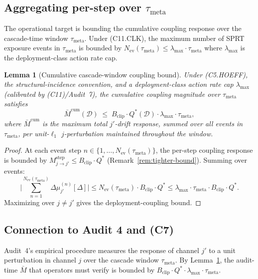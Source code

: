 \documentclass{article}
\newtheorem{lemma}{Lemma}
\newcommand{\Bclip}{B_{\mathrm{clip}}}
\newcommand{\Nev}{N_{\mathrm{ev}}}
\newcommand{\lammax}{\lambda_{\max}}
\newcommand{\taumeta}{\tau_{\mathrm{meta}}}
\begin{document}
\subsection{Aggregating per-step over $\taumeta$}

The operational target is bounding the cumulative coupling response
over the cascade-time window $\taumeta$.  Under (C11.CLK), the
maximum number of SPRT exposure events in $\taumeta$ is bounded by
$\Nev(\taumeta) \leq \lammax \cdot \taumeta$ where $\lammax$ is the
deployment-class action rate cap.

\begin{lemma}[Cumulative cascade-window coupling bound]
\label{lem:cumulative-bound}
Under (C5.HOEFF), the structural-incidence convention, and a
deployment-class action rate cap $\lammax$ (calibrated by
(C11)/Audit~7), the cumulative coupling magnitude over $\taumeta$
satisfies
\begin{equation}
\label{eq:cumulative-bound}
  \bar{M}^{\mathrm{cum}}(\mathcal{D}) \;\leq\; \Bclip \cdot
  Q^*(\mathcal{D}) \cdot \lammax \cdot \taumeta,
\end{equation}
where $\bar{M}^{\mathrm{cum}}$ is the maximum total $j'$-drift
response, summed over all events in $\taumeta$, per unit-$\ell_1$
$j$-perturbation maintained throughout the window.
\end{lemma}

\begin{proof}
At each event step $n \in \{1, \ldots, \Nev(\taumeta)\}$, the
per-step coupling response is bounded by
$M_{j \to j'}^{\mathrm{step}} \leq \Bclip \cdot Q^*$
(Remark~\ref{rem:tighter-bound}).  Summing over events:
\[
  \big| \sum_{n=1}^{\Nev(\taumeta)} \Delta\mu_{j'}^{(n)}[\Delta] \big|
  \leq \Nev(\taumeta) \cdot \Bclip \cdot Q^*
  \leq \lammax \cdot \taumeta \cdot \Bclip \cdot Q^*.
\]
Maximizing over $j \neq j'$ gives the deployment-coupling bound.
\end{proof}

\subsection{Connection to Audit 4 and (C7)}

Audit~4's empirical procedure measures the response of channel
$j'$ to a unit perturbation in channel $j$ over the cascade window
$\taumeta$.  By Lemma~\ref{lem:cumulative-bound}, the audit-time
$\bar{M}$ that operators must verify is bounded by
$\Bclip \cdot Q^* \cdot \lammax \cdot \taumeta$.
\end{document}
